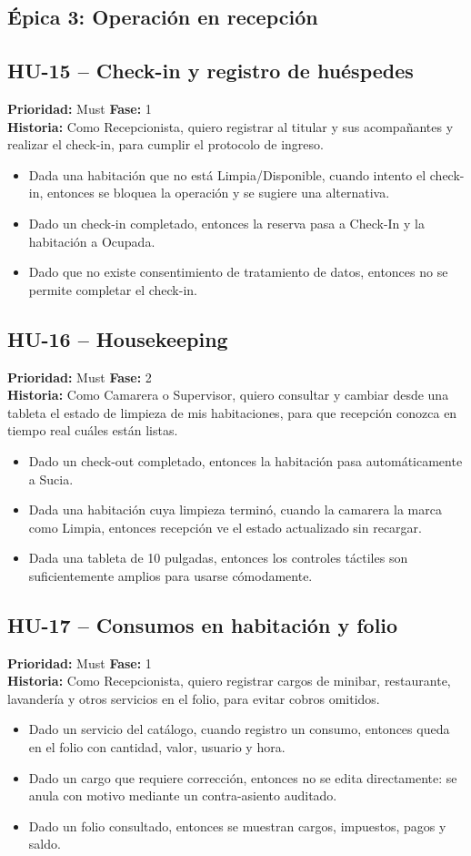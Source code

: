 \documentclass[12pt,a4paper]{article}
\newcommand{\HU}[5]{%
  \subsection*{#1 -- #2}
  \noindent\textbf{Prioridad:} #3 \hfill \textbf{Fase:} #4\\
  \noindent\textbf{Historia:} #5
  \vspace{2mm}
}
\begin{document}
\subsection{Épica 3: Operación en recepción}

\HU{HU-15}{Check-in y registro de huéspedes}{Must}{1}{Como Recepcionista, quiero registrar al titular y sus acompañantes y realizar el check-in, para cumplir el protocolo de ingreso.}
\begin{itemize}
  \item Dada una habitación que no está Limpia/Disponible, cuando intento el check-in, entonces se bloquea la operación y se sugiere una alternativa.
  \item Dado un check-in completado, entonces la reserva pasa a Check-In y la habitación a Ocupada.
  \item Dado que no existe consentimiento de tratamiento de datos, entonces no se permite completar el check-in.
\end{itemize}

\HU{HU-16}{Housekeeping}{Must}{2}{Como Camarera o Supervisor, quiero consultar y cambiar desde una tableta el estado de limpieza de mis habitaciones, para que recepción conozca en tiempo real cuáles están listas.}
\begin{itemize}
  \item Dado un check-out completado, entonces la habitación pasa automáticamente a Sucia.
  \item Dada una habitación cuya limpieza terminó, cuando la camarera la marca como Limpia, entonces recepción ve el estado actualizado sin recargar.
  \item Dada una tableta de 10 pulgadas, entonces los controles táctiles son suficientemente amplios para usarse cómodamente.
\end{itemize}

\HU{HU-17}{Consumos en habitación y folio}{Must}{1}{Como Recepcionista, quiero registrar cargos de minibar, restaurante, lavandería y otros servicios en el folio, para evitar cobros omitidos.}
\begin{itemize}
  \item Dado un servicio del catálogo, cuando registro un consumo, entonces queda en el folio con cantidad, valor, usuario y hora.
  \item Dado un cargo que requiere corrección, entonces no se edita directamente: se anula con motivo mediante un contra-asiento auditado.
  \item Dado un folio consultado, entonces se muestran cargos, impuestos, pagos y saldo.
\end{itemize}
\end{document}
